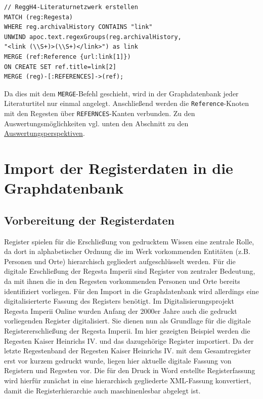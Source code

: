 \documentclass[ngerman,]{scrreprt}
\begin{document}
\begin{verbatim}
// ReggH4-Literaturnetzwerk erstellen
MATCH (reg:Regesta)
WHERE reg.archivalHistory CONTAINS "link"
UNWIND apoc.text.regexGroups(reg.archivalHistory,
"<link (\\S+)>(\\S+)</link>") as link
MERGE (ref:Reference {url:link[1]})
ON CREATE SET ref.title=link[2]
MERGE (reg)-[:REFERENCES]->(ref);
\end{verbatim}

Da dies mit dem \texttt{MERGE}-Befehl geschieht, wird in der Graphdatenbank jeder Literaturtitel nur einmal angelegt. Anschließend werden die \texttt{Reference}-Knoten mit den Regesten über \texttt{REFERNCES}-Kanten verbunden. Zu den Auswertungsmöglichkeiten vgl. unten den Abschnitt zu den \protect\hyperlink{ux5cux23Auswertungsperspektiven}{Auswertungsperspektiven}.

\section{Import der Registerdaten in die Graphdatenbank}\label{import-der-registerdaten-in-die-graphdatenbank}

\subsection{Vorbereitung der Registerdaten}\label{vorbereitung-der-registerdaten}

Register spielen für die Erschließung von gedrucktem Wissen eine zentrale Rolle, da dort in alphabetischer Ordnung die im Werk vorkommenden Entitäten (z.B. Personen und Orte) hierarchisch gegliedert aufgeschlüsselt werden. Für die digitale Erschließung der Regesta Imperii sind Register von zentraler Bedeutung, da mit ihnen die in den Regesten vorkommenden Personen und Orte bereits identifiziert vorliegen. Für den Import in die Graphdatenbank wird allerdings eine digitalisierterte Fassung des Registers benötigt. Im Digitalisierungsprojekt Regesta Imperii Online wurden Anfang der 2000er Jahre auch die gedruckt vorliegenden Register digitalisiert. Sie dienen nun als Grundlage für die digitale Registererschließung der Regesta Imperii. Im hier gezeigten Beispiel werden die Regesten Kaiser Heinrichs IV. und das dazugehörige Register importiert. Da der letzte Regestenband der Regesten Kaiser Heinrichs IV. mit dem Gesamtregister erst vor kurzem gedruckt wurde, liegen hier aktuelle digitale Fassung von Registern und Regesten vor. Die für den Druck in Word erstellte Registerfassung wird hierfür zunächst in eine hierarchisch gegliederte XML-Fassung konvertiert, damit die Registerhierarchie auch maschinenlesbar abgelegt ist.
\end{document}
